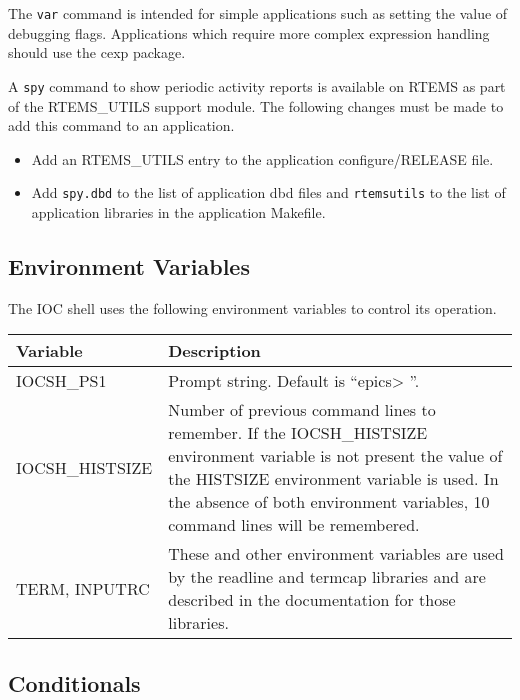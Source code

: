 The \verb|var| command is intended for simple applications such as setting the value of debugging flags.
Applications which require more complex expression handling should use the cexp package.

A \verb|spy| command to show periodic activity reports is available on RTEMS as part of the RTEMS\_UTILS support module.
The following changes must be made to add this command to an application.

\begin{itemize}
\item Add an RTEMS\_UTILS entry to the application configure/RELEASE file.

\item Add \verb|spy.dbd| to the list of application dbd files and \verb|rtemsutils| to the list of application libraries in the application Makefile.

\end{itemize}

\subsection{Environment Variables}

The IOC shell uses the following environment variables to control its operation.
\begin{center}
\begin{longtable}{p{1.35in}p{4.75in}}
Variable & Description\\
\hline
IOCSH\_PS1 & Prompt string. Default is ``epics\textgreater{} ''.\\
IOCSH\_HISTSIZE & Number of previous command lines to remember.
If the IOCSH\_HISTSIZE environment variable is not present the value of the HISTSIZE environment variable is used.
In the absence of both environment variables, 10 command lines will be remembered.\\
TERM, INPUTRC & These and other environment variables are used by the readline and termcap libraries and are described in the documentation for those libraries.
\end{longtable}

\end{center}

\subsection{Conditionals}

